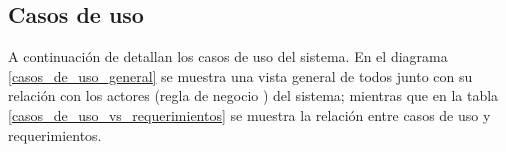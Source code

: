 %
%
%

\subsection{Casos de uso}

A continuación de detallan los casos de uso del sistema. En el diagrama
\ref{casos_de_uso_general} se muestra una vista general de todos junto con su
relación con los actores (regla de negocio )
del sistema; mientras que en la tabla \ref{casos_de_uso_vs_requerimientos} se
muestra la relación entre casos de uso y requerimientos.

